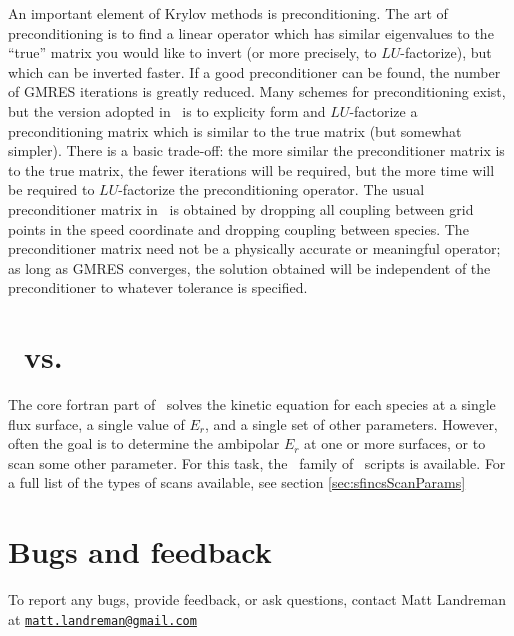An important element of Krylov methods is preconditioning.  The art of preconditioning is to find a linear operator which has similar eigenvalues
to the ``true'' matrix you would like to invert (or more precisely, to $LU$-factorize), but which can be inverted faster.
If a good preconditioner can be found, the number of GMRES iterations is greatly reduced.  Many schemes for preconditioning exist,
but the version adopted in \sfincs~is to explicity form and $LU$-factorize a preconditioning matrix which is similar
to the true matrix (but somewhat simpler).  There is a basic trade-off:
the more similar the preconditioner matrix is to the true matrix, the fewer iterations will be required, but the more time will
be required to $LU$-factorize the preconditioning operator.  The usual preconditioner matrix in \sfincs~is obtained by dropping all coupling
between grid points in the speed coordinate and dropping coupling between species.  The preconditioner matrix need not be a physically
accurate or meaningful operator; as long as GMRES converges, the solution obtained will be independent of the preconditioner to whatever tolerance is specified.

\section{\sfincs~vs. \sfincsScan}
The core fortran part of \sfincs~solves the kinetic equation for each species
at a single flux surface, a single value of $E_r$, and a single set of other parameters.
However, often the goal is to determine the ambipolar $E_r$ at one or more surfaces, or to scan some other parameter.
For this task, the \sfincsScan~family of \python~scripts is available.
For a full list of the types of scans available, see section \ref{sec:sfincsScanParams}

\section{Bugs and feedback}

To report any bugs, provide feedback, or ask questions, contact Matt Landreman at
\href{mailto:matt.landreman@gmail.com}{\nolinkurl{matt.landreman@gmail.com} }






